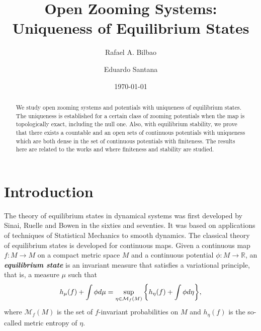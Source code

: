 \documentclass[12pt,a4paper]{amsart}
\theoremstyle{plain}
\begin{document}
	
	\title[Open Zooming Systems: Uniqueness of Equilibrium States]{Open Zooming Systems: Uniqueness of Equilibrium States}
	
	\author[R. A. Bilbao]{Rafael A. Bilbao}
	\address{Rafael A. Bilbao, Universidad Pedag\'ogica y Tecnol\'ogica de Colombia, Avenida
		Central del Norte 39-115, Sede Central Tunja, Boyac\'a, 150003, Colombia. 
	}
	
	
	
	\author[E. Santana]{Eduardo Santana}
	\address{Eduardo Santana, Universidade Federal de Alagoas, 57200-000 Penedo, Brazil}




\date{\today}





\maketitle

\begin{abstract} 
We study open zooming systems and potentials with uniqueness of equilibrium states. The uniqueness is established for a certain class of zooming potentials when the map is topologically exact, including the null one. Also, with equilibrium stability, we prove that there exists a countable and an open sets of continuous potentials with uniqueness which are both dense in the set of continuous potentials with finiteness. The results here are related to the works \cite{BiS} and \cite{S} where finiteness and stability are studied.
\end{abstract}


\bigskip





\section{Introduction}
The theory of equilibrium states in dynamical systems was first developed by Sinai, Ruelle and Bowen in the sixties and seventies. 
It was based on applications of techniques of Statistical Mechanics to smooth dynamics. The classical theory of equilibrium states is developed for continuous maps. Given a continuous map $f: M \to M$ on a compact metric space $M$ and a continuous potential $\phi : M \to \mathbb{R}$, an  \textbf{\textit{equilibrium state}} is an 
invariant measure that satisfies a variational principle, that is, a measure $\mu$ such that
\begin{equation}\label{equilibrium}
	\displaystyle h_{\mu}(f) + \int \phi d\mu = \sup_{\eta \in \mathcal{M}_{f}(M)} \bigg{\{} h_{\eta}(f) + \int \phi d\eta \bigg{\}},
\end{equation}
where $\mathcal{M}_{f}(M)$ is the set of $f$-invariant probabilities on $M$ and $h_{\eta}(f)$ is the so-called metric entropy of $\eta$.
\end{document}
